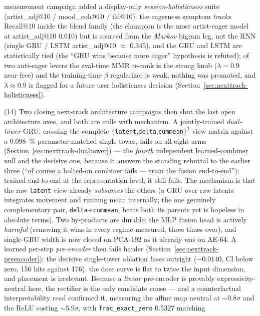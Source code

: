 \documentclass[11pt]{article}
\begin{document}
measurement campaign added a display-only \emph{session-holisticness} suite
(artist\_adj@10 / mood\_coh@10 / ild@10): the eagerness symptom \emph{tracks}
Recall@10 inside the blend family (the champion is the most artist-eager model at
artist\_adj@10 \num{0.610}) but is sourced from the \emph{Markov} bigram leg, not
the RNN (single GRU / LSTM artist\_adj@10 $\approx$ \num{0.345}), and the GRU and
LSTM are statistically tied (the ``GRU wins because more eager'' hypothesis is
refuted); of two anti-eager levers the eval-time MMR re-rank is the strong knob
($\lambda{=}\num{0.9}$ near-free) and the training-time $\beta$ regularizer is weak,
nothing was promoted, and $\lambda\approx\num{0.9}$ is flagged for a future user
holisticness decision (Section~\ref{sec:nexttrack-holisticness}).

(14) Two closing next-track architecture campaigns then shut the last open
architecture axes, and both are nulls with mechanism. A jointly-trained
\emph{dual-tower} GRU, crossing the complete
$\{$\texttt{latent},\texttt{delta},\texttt{cummean}$\}^2$ view matrix against a
\SI{0.098}{\percent} parameter-matched single tower, fails on all eight arms
(Section~\ref{sec:nexttrack-dualtower}) --- the \emph{fourth} independent
learned-combiner null and the decisive one, because it answers the standing
rebuttal to the earlier three (``of course a bolted-on combiner fails --- train
the fusion end-to-end''): trained end-to-end at the representation level, it
still fails. The mechanism is that the raw \texttt{latent} view already
\emph{subsumes} the others (a GRU over raw latents integrates movement and
running mean internally; the one genuinely complementary pair,
\texttt{delta}$+$\texttt{cummean}, beats both its parents yet is hopeless in
absolute terms). Two by-products are durable: the MLP fusion head is actively
\emph{harmful} (removing it wins in every regime measured, three times over), and
single-GRU width is now closed on PCA-192 as it already was on AE-64. A learned
per-step \emph{pre-encoder} then fails harder
(Section~\ref{sec:nexttrack-preencoder}): the decisive single-tower ablation
\emph{loses} outright ($-\num{0.0140}$, CI below zero, \num{156} hits against
\num{176}), the dose curve is flat to twice the input dimension, and placement is
irrelevant. Because a \emph{linear} pre-encoder is provably expressivity-neutral
here, the rectifier is the only candidate cause --- and a counterfactual
interpretability read confirmed it, measuring the affine map neutral at
${\sim}0.8\sigma$ and the ReLU costing ${\sim}5.9\sigma$, with
\texttt{frac\_exact\_zero} \num{0.5327} matching
\end{document}
